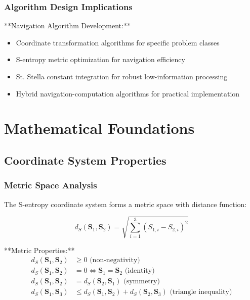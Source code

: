 \documentclass[12pt,a4paper]{article}
\begin{document}
\subsubsection{Algorithm Design Implications}

**Navigation Algorithm Development:**
\begin{itemize}
\item Coordinate transformation algorithms for specific problem classes
\item S-entropy metric optimization for navigation efficiency
\item St. Stella constant integration for robust low-information processing
\item Hybrid navigation-computation algorithms for practical implementation
\end{itemize}

\section{Mathematical Foundations}

\subsection{Coordinate System Properties}

\subsubsection{Metric Space Analysis}

The S-entropy coordinate system forms a metric space with distance function:

\begin{equation}
d_S(\mathbf{S}_1, \mathbf{S}_2) = \sqrt{\sum_{i=1}^{3} (S_{1,i} - S_{2,i})^2}
\label{eq:s_entropy_metric}
\end{equation}

**Metric Properties:**
\begin{align}
d_S(\mathbf{S}_1, \mathbf{S}_2) &\geq 0 \text{ (non-negativity)} \\
d_S(\mathbf{S}_1, \mathbf{S}_2) &= 0 \iff \mathbf{S}_1 = \mathbf{S}_2 \text{ (identity)} \\
d_S(\mathbf{S}_1, \mathbf{S}_2) &= d_S(\mathbf{S}_2, \mathbf{S}_1) \text{ (symmetry)} \\
d_S(\mathbf{S}_1, \mathbf{S}_3) &\leq d_S(\mathbf{S}_1, \mathbf{S}_2) + d_S(\mathbf{S}_2, \mathbf{S}_3) \text{ (triangle inequality)}
\end{align}
\end{document}

